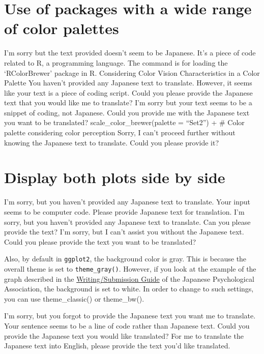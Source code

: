 \documentclass[
  a4paper,
]{book}
\begin{document}

\chapter{Use of packages with a wide range of color
palettes}\label{use-of-packages-with-a-wide-range-of-color-palettes}

I'm sorry but the text provided doesn't seem to be Japanese. It's a
piece of code related to R, a programming language. The command is for
loading the `RColorBrewer' package in R. Considering Color Vision
Characteristics in a Color Palette You haven't provided any Japanese
text to translate. However, it seems like your text is a piece of coding
script. Could you please provide the Japanese text that you would like
me to translate? I'm sorry but your text seems to be a snippet of
coding, not Japanese. Could you provide me with the Japanese text you
want to be translated? scale\_color\_brewer(palette = ``Set2'') + \#
Color palette considering color perception Sorry, I can't proceed
further without knowing the Japanese text to translate. Could you please
provide it?


\chapter{Display both plots side by
side}\label{display-both-plots-side-by-side}

I'm sorry, but you haven't provided any Japanese text to translate. Your
input seems to be computer code. Please provide Japanese text for
translation. I'm sorry, but you haven't provided any Japanese text to
translate. Can you please provide the text? I'm sorry, but I can't
assist you without the Japanese text. Could you please provide the text
you want to be translated?

Also, by default in \texttt{ggplot2}, the background color is gray. This
is because the overall theme is set to \texttt{theme\_gray()}. However,
if you look at the example of the graph described in the
\href{https://psych.or.jp/manual/}{Writing/Submission Guide} of the
Japanese Psychological Association, the background is set to white. In
order to change to such settings, you can use theme\_classic() or
theme\_bw().

I'm sorry, but you forgot to provide the Japanese text you want me to
translate. Your sentence seems to be a line of code rather than Japanese
text. Could you provide the Japanese text you would like translated? For
me to translate the Japanese text into English, please provide the text
you'd like translated.
\end{document}
